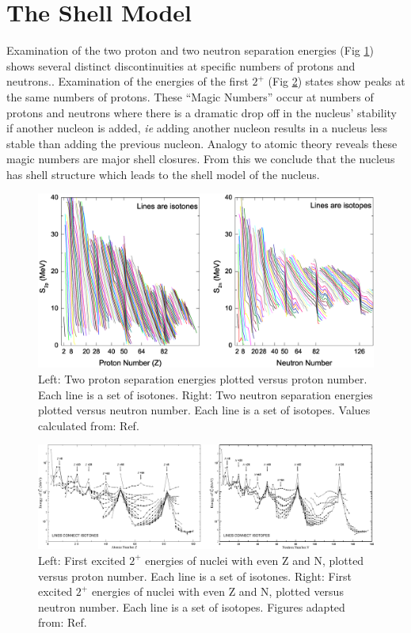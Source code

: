 \section{The Shell Model}
\label{sec:models-shell-model}
Examination of the two proton and two neutron separation energies (Fig \ref{fig:chp2-masses}) shows several distinct discontinuities at specific numbers of protons and neutrons.. Examination of the energies of the first $2^+$ (Fig \ref{fig:chp2-two-plus-energies}) states show peaks at the same numbers of protons. These ``Magic Numbers'' occur at numbers of protons and neutrons where there is a dramatic drop off in the nucleus' stability if another nucleon is added, \emph{ie} adding another nucleon results in a nucleus less stable than adding the previous nucleon. Analogy to atomic theory reveals these magic numbers are major shell closures. From this we conclude that the nucleus has shell structure which leads to the shell model of the nucleus.

\begin{figure}[h!]
\centerline{\includegraphics[width=\textwidth]{./img/c2/2nuc_sep_en.eps}}
	\caption{Left: Two proton separation energies plotted versus proton number. Each line is a set of isotones. Right: Two neutron separation energies plotted versus neutron number. Each line is a set of isotopes. Values calculated from: Ref.\cite{AME20031,AME20032}\label{fig:chp2-masses}}
\end{figure}

\begin{figure}[h!]
\centerline{\includegraphics[width=\textwidth]{./img/c2/2_plus_en.eps}}
	\caption{Left: First excited $2^+$ energies of nuclei with even Z and N, plotted versus proton number. Each line is a set of isotones. Right: First excited $2^+$ energies of nuclei with even Z and N, plotted versus neutron number. Each line is a set of isotopes. Figures adapted from: Ref.\cite{RamanTwoPlus}\label{fig:chp2-two-plus-energies}}
\end{figure}

